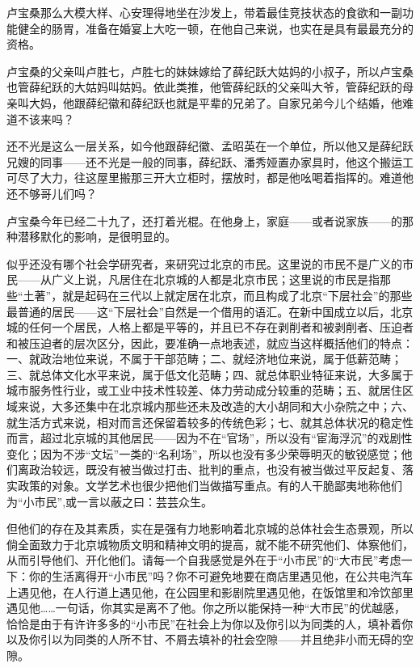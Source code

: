 \par 卢宝桑那么大模大样、心安理得地坐在沙发上，带着最佳竞技状态的食欲和一副功能健全的肠胃，准备在婚宴上大吃一顿，在他自己来说，也实在是具有最最充分的资格。
\par 卢宝桑的父亲叫卢胜七，卢胜七的妹妹嫁给了薛纪跃大姑妈的小叔子，所以卢宝桑也管薛纪跃的大姑妈叫姑妈。依此类推，他管薛纪跃的父亲叫大爷，管薛纪跃的母亲叫大妈，他跟薛纪徽和薛纪跃也就是平辈的兄弟了。自家兄弟今儿个结婚，他难道不该来吗？
\par 还不光是这么一层关系，如今他跟薛纪徽、孟昭英在一个单位，所以他又是薛纪跃兄嫂的同事——还不光是一般的同事，薛纪跃、潘秀娅置办家具时，他这个搬运工可尽了大力，往这屋里搬那三开大立柜时，摆放时，都是他吆喝着指挥的。难道他还不够哥儿们吗？
\par 卢宝桑今年已经二十九了，还打着光棍。在他身上，家庭——或者说家族——的那种潜移默化的影响，是很明显的。
\par 似乎还没有哪个社会学研究者，来研究过北京的市民。这里说的市民不是广义的市民——从广义上说，凡居住在北京城的人都是北京市民；这里说的市民是指那些“土著”，就是起码在三代以上就定居在北京，而且构成了北京“下层社会”的那些最普通的居民——这“下层社会”自然是一个借用的语汇。在新中国成立以后，北京城的任何一个居民，人格上都是平等的，并且已不存在剥削者和被剥削者、压迫者和被压迫者的层次区分，因此，要准确一点地表述，就应当这样概括他们的特点：一、就政治地位来说，不属于干部范畴；二、就经济地位来说，属于低薪范畴；三、就总体文化水平来说，属于低文化范畴；四、就总体职业特征来说，大多属于城市服务性行业，或工业中技术性较差、体力劳动成分较重的范畴；五、就居住区域来说，大多还集中在北京城内那些还未及改造的大小胡同和大小杂院之中；六、就生活方式来说，相对而言还保留着较多的传统色彩；七、就其总体状况的稳定性而言，超过北京城的其他居民——因为不在“官场”，所以没有“宦海浮沉”的戏剧性变化；因为不涉“文坛”一类的“名利场”，所以也没有多少荣辱明灭的敏锐感觉；他们离政治较远，既没有被当做过打击、批判的重点，也没有被当做过平反起复、落实政策的对象。文学艺术也很少把他们当做描写重点。有的人干脆鄙夷地称他们为“小市民”,或一言以蔽之曰：芸芸众生。
\par 但他们的存在及其素质，实在是强有力地影响着北京城的总体社会生态景观，所以倘全面致力于北京城物质文明和精神文明的提高，就不能不研究他们、体察他们，从而引导他们、开化他们。请每一个自我感觉是外在于“小市民”的“大市民”考虑一下：你的生活离得开“小市民”吗？你不可避免地要在商店里遇见他，在公共电汽车上遇见他，在人行道上遇见他，在公园里和影剧院里遇见他，在饭馆里和冷饮部里遇见他……一句话，你其实是离不了他。你之所以能保持一种“大市民”的优越感，恰恰是由于有许许多多的“小市民”在社会上为你以及你引以为同类的人，填补着你以及你引以为同类的人所不甘、不屑去填补的社会空隙——并且绝非小而无碍的空隙。
